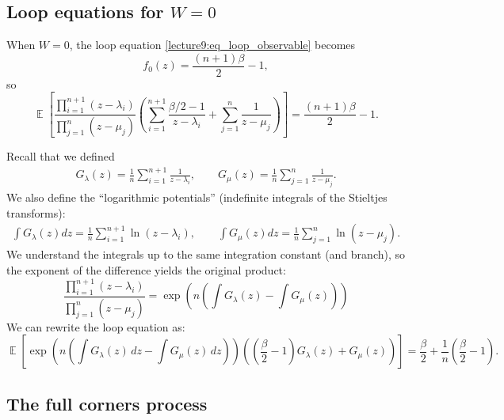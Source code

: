 \documentclass[letterpaper,11pt,oneside,reqno]{book}
\numberwithin{equation}{chapter}  %
\theoremstyle{definition}
\begin{document}
\subsection{Loop equations for \texorpdfstring{$W=0$}{W=0}}

When $W=0$, the loop equation \eqref{lecture9:eq_loop_observable} becomes
\begin{equation*}
	f_0(z)=\frac{(n+1)\beta}{2}-1,
\end{equation*}
so
\begin{equation*}
		\operatorname{\mathbb{E}}\left[\frac{\prod_{i=1}^{n+1}(z-\lambda_i)}{\prod_{j=1}^n(z-\mu_j)}\left(\sum_{i=1}^{n+1}\frac{\beta/2-1}{z-\lambda_i} + \sum_{j=1}^n\frac{1}{z-\mu_j}\right)\right] = \frac{(n+1)\beta}{2}-1.
\end{equation*}

Recall that we defined
\begin{align*}
G_\lambda(z) = \frac{1}{n}\sum_{i=1}^{n+1}\frac{1}{z-\lambda_i},
\qquad
G_\mu(z) = \frac{1}{n}\sum_{j=1}^n\frac{1}{z-\mu_j}.
\end{align*}
We also define the ``logarithmic potentials'' (indefinite integrals of the Stieltjes transforms):
\begin{align*}
\int G_\lambda(z)dz = \frac{1}{n}\sum_{i=1}^{n+1}\ln(z-\lambda_i), \qquad
\int G_\mu(z)dz = \frac{1}{n}\sum_{j=1}^n\ln(z-\mu_j).
\end{align*}
We understand the integrals up to the same integration constant (and branch), so the exponent of the difference
yields the original product:
\begin{equation*}
	\frac{\prod_{i=1}^{n+1}(z-\lambda_i)}{\prod_{j=1}^n(z-\mu_j)} = \exp\left(n\left(\int G_\lambda(z) - \int G_\mu(z)\right)\right)
\end{equation*}
We can rewrite
the loop equation
as:
\begin{equation} \label{lecture9:eq:stieltjes_transform_eq}
	\operatorname{\mathbb{E}}\left[\exp\left(n\left(\int G_\lambda(z)\,dz - \int G_\mu(z)\,dz\right)\right)\left(\left(\frac{\beta}{2}-1\right)G_\lambda(z) + G_\mu(z)\right)\right] = \frac{\beta}{2} + \frac{1}{n}\left(\frac{\beta}{2}-1\right).
\end{equation}

\subsection{The full corners process}
\end{document}
